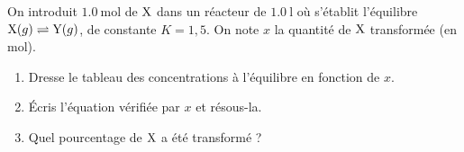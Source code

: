 \documentclass[11pt,a4paper]{article}
\begin{document}
\begin{exo}
On introduit $\qty{1.0}{\mol}$ de $\ce{X}$ dans un réacteur de $\qty{1.0}{\litre}$ où s'établit l'équilibre $\ce{X}(g) \rightleftharpoons \ce{Y}(g)$, de constante $K=1{,}5$. On note $x$ la quantité de $\ce{X}$ transformée (en $\si{\mol}$).
\begin{enumerate}[label=\alph*)]
  \item Dresse le tableau des concentrations à l'équilibre en fonction de $x$.
  \item Écris l'équation vérifiée par $x$ et résous-la.
  \item Quel pourcentage de $\ce{X}$ a été transformé ?
\end{enumerate}
\end{exo}
\end{document}
